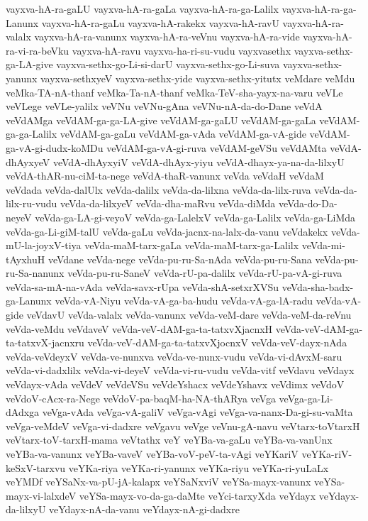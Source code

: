 {vayxva-hA-ra-gaLU
vayxva-hA-ra-gaLa
vayxva-hA-ra-ga-Lalilx
vayxva-hA-ra-ga-Lanunx
vayxva-hA-ra-gaLu
vayxva-hA-rakekx
vayxva-hA-ravU
vayxva-hA-ra-valalx
vayxva-hA-ra-vanunx
vayxva-hA-ra-veVnu
vayxva-hA-ra-vide
vayxva-hA-ra-vi-ra-beVku
vayxva-hA-ravu
vayxva-ha-ri-su-vudu
vayxvasethx
vayxva-sethx-ga-LA-give
vayxva-sethx-go-Li-si-darU
vayxva-sethx-go-Li-suva
vayxva-sethx-yanunx
vayxva-sethxyeV
vayxva-sethx-yide
vayxva-sethx-yitutx
veMdare
veMdu
veMka-TA-nA-thanf
veMka-Ta-nA-thanf
veMka-TeV-sha-yayx-na-varu
veVLe
veVLege
veVLe-yalilx
veVNu
veVNu-gAna
veVNu-nA-da-do-Dane
veVdA
veVdAMga
veVdAM-ga-ga-LA-give
veVdAM-ga-gaLU
veVdAM-ga-gaLa
veVdAM-ga-ga-Lalilx
veVdAM-ga-gaLu
veVdAM-ga-vAda
veVdAM-ga-vA-gide
veVdAM-ga-vA-gi-dudx-koMDu
veVdAM-ga-vA-gi-ruva
veVdAM-geVSu
veVdAMta
veVdA-dhAyxyeV
veVdA-dhAyxyiV
veVdA-dhAyx-yiyu
veVdA-dhayx-ya-na-da-lilxyU
veVdA-thAR-nu-ciM-ta-nege
veVdA-thaR-vanunx
veVda
veVdaH
veVdaM
veVdada
veVda-dalUlx
veVda-dalilx
veVda-da-lilxna
veVda-da-lilx-ruva
veVda-da-lilx-ru-vudu
veVda-da-lilxyeV
veVda-dha-maRvu
veVda-diMda
veVda-do-Da-neyeV
veVda-ga-LA-gi-veyoV
veVda-ga-LalelxV
veVda-ga-Lalilx
veVda-ga-LiMda
veVda-ga-Li-giM-talU
veVda-gaLu
veVda-jacnx-na-lalx-da-vanu
veVdakekx
veVda-mU-la-joyxV-tiya
veVda-maM-tarx-gaLa
veVda-maM-tarx-ga-Lalilx
veVda-mi-tAyxhuH
veVdane
veVda-nege
veVda-pu-ru-Sa-nAda
veVda-pu-ru-Sana
veVda-pu-ru-Sa-nanunx
veVda-pu-ru-SaneV
veVda-rU-pa-dalilx
veVda-rU-pa-vA-gi-ruva
veVda-sa-mA-na-vAda
veVda-savx-rUpa
veVda-shA-setxrXVSu
veVda-sha-badx-ga-Lanunx
veVda-vA-Niyu
veVda-vA-ga-ba-hudu
veVda-vA-ga-lA-radu
veVda-vA-gide
veVdavU
veVda-valalx
veVda-vanunx
veVda-veM-dare
veVda-veM-da-reVnu
veVda-veMdu
veVdaveV
veVda-veV-dAM-ga-ta-tatxvXjacnxH
veVda-veV-dAM-ga-ta-tatxvX-jacnxru
veVda-veV-dAM-ga-ta-tatxvXjocnxV
veVda-veV-dayx-nAda
veVda-veVdeyxV
veVda-ve-nunxva
veVda-ve-nunx-vudu
veVda-vi-dAvxM-saru
veVda-vi-dadxlilx
veVda-vi-deyeV
veVda-vi-ru-vudu
veVda-vitf
veVdavu
veVdayx
veVdayx-vAda
veVdeV
veVdeVSu
veVdeYshacx
veVdeYshavx
veVdimx
veVdoV
veVdoV-cAcx-ra-Nege
veVdoV-pa-baqM-ha-NA-thARya
veVga
veVga-ga-Li-dAdxga
veVga-vAda
veVga-vA-galiV
veVga-vAgi
veVga-va-nanx-Da-gi-su-vaMta
veVga-veMdeV
veVga-vi-dadxre
veVgavu
veVge
veVnu-gA-navu
veVtarx-toVtarxH
veVtarx-toV-tarxH-mama
veVtathx
veY
veYBa-va-gaLu
veYBa-va-vanUnx
veYBa-va-vanunx
veYBa-vaveV
veYBa-voV-peV-ta-vAgi
veYKariV
veYKa-riV-keSxV-tarxvu
veYKa-riya
veYKa-ri-yanunx
veYKa-riyu
veYKa-ri-yuLaLx
veYMDf
veYSaNx-va-pU-jA-kalapx
veYSaNxviV
veYSa-mayx-vanunx
veYSa-mayx-vi-lalxdeV
veYSa-mayx-vo-da-ga-daMte
veYci-tarxyXda
veYdayx
veYdayx-da-lilxyU
veYdayx-nA-da-vanu
veYdayx-nA-gi-dadxre
}
